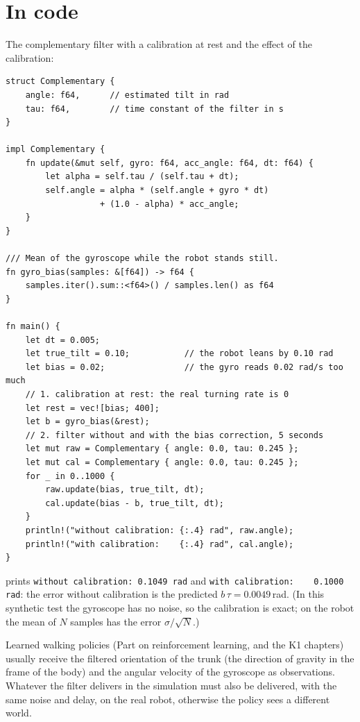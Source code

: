 \section*{In code}
The complementary filter with a calibration at rest and the effect of the calibration:
\begin{verbatim}
struct Complementary {
    angle: f64,      // estimated tilt in rad
    tau: f64,        // time constant of the filter in s
}

impl Complementary {
    fn update(&mut self, gyro: f64, acc_angle: f64, dt: f64) {
        let alpha = self.tau / (self.tau + dt);
        self.angle = alpha * (self.angle + gyro * dt)
                   + (1.0 - alpha) * acc_angle;
    }
}

/// Mean of the gyroscope while the robot stands still.
fn gyro_bias(samples: &[f64]) -> f64 {
    samples.iter().sum::<f64>() / samples.len() as f64
}

fn main() {
    let dt = 0.005;
    let true_tilt = 0.10;           // the robot leans by 0.10 rad
    let bias = 0.02;                // the gyro reads 0.02 rad/s too much
    // 1. calibration at rest: the real turning rate is 0
    let rest = vec![bias; 400];
    let b = gyro_bias(&rest);
    // 2. filter without and with the bias correction, 5 seconds
    let mut raw = Complementary { angle: 0.0, tau: 0.245 };
    let mut cal = Complementary { angle: 0.0, tau: 0.245 };
    for _ in 0..1000 {
        raw.update(bias, true_tilt, dt);
        cal.update(bias - b, true_tilt, dt);
    }
    println!("without calibration: {:.4} rad", raw.angle);
    println!("with calibration:    {:.4} rad", cal.angle);
}
\end{verbatim}
prints \verb!without calibration: 0.1049 rad! and \verb!with calibration:    0.1000 rad!: the error without calibration is the predicted $b\,\tau=0.0049$\,rad. (In this synthetic test the gyroscope has no noise, so the calibration is exact; on the robot the mean of $N$ samples has the error $\sigma/\sqrt N$.)

\begin{aibox}
Learned walking policies (Part on reinforcement learning, and the K1 chapters) usually receive the filtered orientation of the trunk (the direction of gravity in the frame of the body) and the angular velocity of the gyroscope as observations. Whatever the filter delivers in the simulation must also be delivered, with the same noise and delay, on the real robot, otherwise the policy sees a different world.
\end{aibox}

